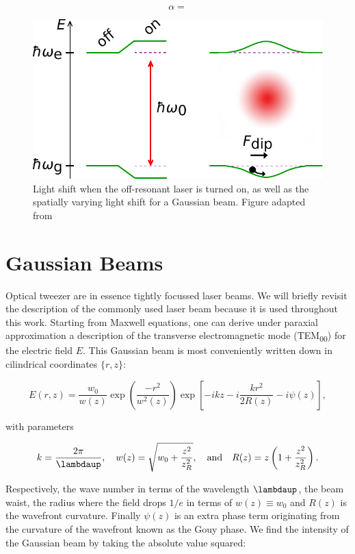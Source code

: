\begin{equation}
	\alpha = 
\end{equation}


\begin{figure}
	\centering
	\includegraphics[width=.45\linewidth]{figures/LightShift.pdf}
	\caption{Light shift when the off-resonant laser is turned on, as well as the spatially varying light shift for a Gaussian beam. Figure adapted from \cite{Grimm2000}}
	\label{fig:DipoleForce}
\end{figure}




\section{Gaussian Beams}\label{sec:GaussianBeams}

Optical tweezer are in essence tightly focussed laser beams. We will briefly revisit the description of the commonly used laser beam because it is used throughout this work. Starting from Maxwell equations, one can derive under paraxial approximation a description of the transverse electromagnetic mode (TEM\textsubscript{00}) \cite{Leeuwen2017} for the electric field $E$. This Gaussian beam is most conveniently written down in cilindrical coordinates $\{r,z\}$:

\begin{equation}\label{GaussianBeam}
	E(r,z) = \frac{w_0}{w(z)} \exp{\left(\frac{-r^2}{w^2(z)}\right)} \exp{\left[-ikz-i\frac{kr^2}{2R(z)} - i\psi(z)\right]},
\end{equation}

with parameters

\begin{equation}
	k = \frac{2\pi}{\lambdaup}, \quad 
	w(z) = \sqrt{w_0 + \frac{z^2}{z_R^2}}, \quad \text{and} \quad
	R(z) = z \left(1 + \frac{z^2}{z_R^2}\right).
\end{equation}

Respectively, the wave number in terms of the wavelength $\lambdaup$, the beam waist, the radius where the field drops $1/e$ in terms of $w(z)\equiv w_0$ and $R(z)$ is the wavefront curvature. Finally $\psi(z)$ is an extra phase term originating from the curvature of the wavefront known as the Gouy phase. We find the intensity of the Gaussian beam by taking the absolute value squared:


